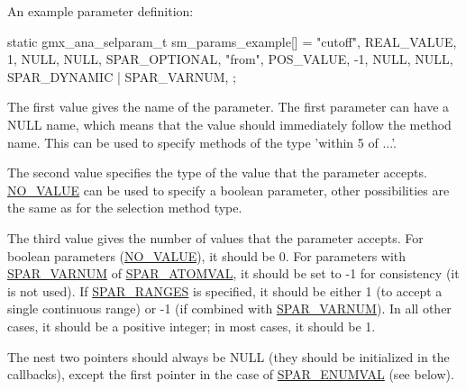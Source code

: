 \-An example parameter definition\-: 
\begin{DoxyCode}
 static gmx_ana_selparam_t sm_params_example[] = {
   {"cutoff", {REAL_VALUE, 1, {NULL}}, NULL, SPAR_OPTIONAL},
   {"from",   {POS_VALUE, -1, {NULL}}, NULL, SPAR_DYNAMIC | SPAR_VARNUM},
 };
\end{DoxyCode}


\-The first value gives the name of the parameter. \-The first parameter can have a \-N\-U\-L\-L name, which means that the value should immediately follow the method name. \-This can be used to specify methods of the type 'within 5 of ...'.

\-The second value specifies the type of the value that the parameter accepts. \hyperlink{share_2template_2gromacs_2selvalue_8h_a70b42b87d434580bf1493591857b8beca4d694119ce83b62d74ff06b5e017dca8}{\-N\-O\-\_\-\-V\-A\-L\-U\-E} can be used to specify a boolean parameter, other possibilities are the same as for the selection method type.

\-The third value gives the number of values that the parameter accepts. \-For boolean parameters (\hyperlink{share_2template_2gromacs_2selvalue_8h_a70b42b87d434580bf1493591857b8beca4d694119ce83b62d74ff06b5e017dca8}{\-N\-O\-\_\-\-V\-A\-L\-U\-E}), it should be 0. \-For parameters with \hyperlink{share_2template_2gromacs_2selparam_8h_a400330277d7e17cdfef1610cc37838ea}{\-S\-P\-A\-R\-\_\-\-V\-A\-R\-N\-U\-M} of \hyperlink{share_2template_2gromacs_2selparam_8h_ababaf52ada40922bb660a4949e1e52f0}{\-S\-P\-A\-R\-\_\-\-A\-T\-O\-M\-V\-A\-L}, it should be set to -\/1 for consistency (it is not used). \-If \hyperlink{share_2template_2gromacs_2selparam_8h_ab39fef32ca729815df1299fafdd623b1}{\-S\-P\-A\-R\-\_\-\-R\-A\-N\-G\-E\-S} is specified, it should be either 1 (to accept a single continuous range) or -\/1 (if combined with \hyperlink{share_2template_2gromacs_2selparam_8h_a400330277d7e17cdfef1610cc37838ea}{\-S\-P\-A\-R\-\_\-\-V\-A\-R\-N\-U\-M}). \-In all other cases, it should be a positive integer; in most cases, it should be 1.

\-The nest two pointers should always be \-N\-U\-L\-L (they should be initialized in the callbacks), except the first pointer in the case of \hyperlink{share_2template_2gromacs_2selparam_8h_a9cab7952c47c82291754bb1b90db31e7}{\-S\-P\-A\-R\-\_\-\-E\-N\-U\-M\-V\-A\-L} (see below).

